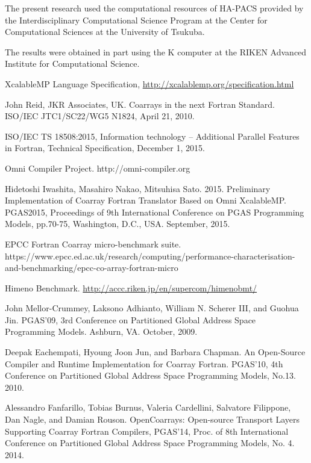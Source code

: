 \documentclass[graybox]{svmult}
\begin{document}
The present research used the computational resources of HA-PACS provided by the 
Interdisciplinary Computational Science Program at the Center for 
Computational Sciences at the University of Tsukuba. 

The results were obtained in part using the K computer at the RIKEN Advanced 
Institute for Computational Science. %


\begin{thebibliography}{99}

XcalableMP Language Specification, \url{http://xcalablemp.org/specification.html}

John Reid, JKR Associates, UK. Coarrays in the next Fortran Standard.
ISO/IEC JTC1/SC22/WG5 N1824, April 21, 2010.

 ISO/IEC TS 18508:2015, Information technology -- 
Additional Parallel Features in Fortran, Technical Specification, December 1, 2015.

Omni Compiler Project. http://omni-compiler.org

Hidetoshi Iwashita, Masahiro Nakao, Mitsuhisa Sato. 2015. Preliminary Implementation 
of Coarray Fortran Translator Based on Omni XcalableMP. PGAS2015, Proceedings of 9th 
International Conference on PGAS Programming Models, pp.70-75, Washington, D.C., USA.
September, 2015.

 EPCC Fortran Coarray micro-benchmark suite.\\
https://www.epcc.ed.ac.uk/research/computing/performance-characterisation-and-benchmarking/epcc-co-array-fortran-micro

Himeno Benchmark. \url{http://accc.riken.jp/en/supercom/himenobmt/}

John Mellor-Crummey, Laksono Adhianto, William N. Scherer III, and Guohua Jin. 
PGAS'09, 3rd Conference on Partitioned Global Address Space Programming Models. 
Ashburn, VA. October, 2009.

Deepak Eachempati, Hyoung Joon Jun, and Barbara Chapman. 
An Open-Source Compiler and Runtime Implementation for Coarray Fortran. 
PGAS'10, 4th Conference on Partitioned Global Address Space Programming Models, 
No.13. 2010.

Alessandro Fanfarillo, Tobias Burnus, Valeria Cardellini, Salvatore Filippone, 
Dan Nagle, and Damian Rouson. OpenCoarrays: Open-source Transport Layers 
Supporting Coarray Fortran Compilers, PGAS'14, Proc. of 8th International 
Conference on Partitioned Global Address Space Programming Models, No. 4. 2014.



\end{thebibliography}
\end{document}
